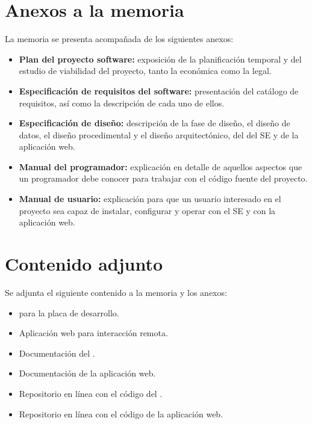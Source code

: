 \section{Anexos a la memoria}\label{sec:anexos}
La memoria se presenta acompañada de los siguientes anexos:

\begin{itemize}
\item
  \textbf{Plan del proyecto software:} exposición de la planificación temporal y
  del estudio de viabilidad del proyecto, tanto la económica como la legal.
\item
  \textbf{Especificación de requisitos del software:} presentación del catálogo
  de requisitos, así como la descripción de cada uno de ellos.
\item
  \textbf{Especificación de diseño:} descripción de la fase de diseño, el
  diseño de datos, el diseño procedimental y el diseño arquitectónico, del
   del SE y de la aplicación web.
\item
  \textbf{Manual del programador:} explicación en detalle de aquellos aspectos
  que un programador debe conocer para trabajar con el código fuente del
  proyecto.
\item
  \textbf{Manual de usuario:} explicación para que un usuario interesado en el
  proyecto sea capaz de instalar, configurar y operar con el SE y con la
  aplicación web.
\end{itemize}

\clearpage

\section{Contenido adjunto}\label{sec:adjunto}
Se adjunta el siguiente contenido a la memoria y los anexos:

\begin{itemize}
\item
   para la placa de desarrollo.
\item
  Aplicación web para interacción remota.
\item	
  Documentación del .
\item	
  Documentación de la aplicación web.
\item
  Repositorio en línea con el código del .
\item
  Repositorio en línea con el código de la aplicación web.
\end{itemize}
